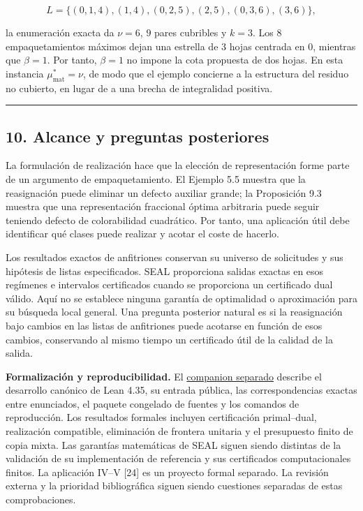 \documentclass[spanish,11pt,a4paper]{article}
\begin{document}
\[
L=\{(0,1,4),(1,4),(0,2,5),(2,5),(0,3,6),(3,6)\},
\]

la enumeración exacta da \(\nu=6\), \(9\) pares cubribles y \(k=3\). Los
\(8\) empaquetamientos máximos dejan una estrella de \(3\) hojas
centrada en \(0\), mientras que \(\beta=1\). Por tanto, \(\beta=1\) no
impone la cota propuesta de dos hojas. En esta instancia
\(\mu^*_{\mathrm{mat}}=\nu\), de modo que el ejemplo concierne a la
estructura del residuo no cubierto, en lugar de a una brecha de
integralidad positiva.

\begin{center}\rule{0.5\linewidth}{0.5pt}\end{center}

\subsection{10. Alcance y preguntas
posteriores}\label{alcance-y-preguntas-posteriores}

La formulación de realización hace que la elección de representación
forme parte de un argumento de empaquetamiento. El Ejemplo 5.5 muestra
que la reasignación puede eliminar un defecto auxiliar grande; la
Proposición 9.3 muestra que una representación fraccional óptima
arbitraria puede seguir teniendo defecto de colorabilidad cuadrático.
Por tanto, una aplicación útil debe identificar qué clases puede
realizar y acotar el coste de hacerlo.

Los resultados exactos de anfitriones conservan su universo de
solicitudes y sus hipótesis de listas especificados. SEAL proporciona
salidas exactas en esos regímenes e intervalos certificados cuando se
proporciona un certificado dual válido. Aquí no se establece ninguna
garantía de optimalidad o aproximación para su búsqueda local general.
Una pregunta posterior natural es si la reasignación bajo cambios en las
listas de anfitriones puede acotarse en función de esos cambios,
conservando al mismo tiempo un certificado útil de la calidad de la
salida.

\textbf{Formalización y reproducibilidad.} El
\href{https://github.com/jtraverso/erdos-81-chordal-clique-partitions/tree/main/preprints/PAPER_V/05_formalization}{companion
separado} describe el desarrollo canónico de Lean 4.35, su entrada
pública, las correspondencias exactas entre enunciados, el paquete
congelado de fuentes y los comandos de reproducción. Los resultados
formales incluyen certificación primal--dual, realización compatible,
eliminación de frontera unitaria y el presupuesto finito de copia mixta.
Las garantías matemáticas de SEAL siguen siendo distintas de la
validación de su implementación de referencia y sus certificados
computacionales finitos. La aplicación IV--V {[}24{]} es un proyecto
formal separado. La revisión externa y la prioridad bibliográfica siguen
siendo cuestiones separadas de estas comprobaciones.
\end{document}
